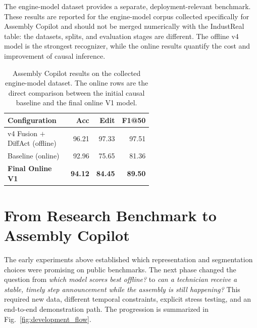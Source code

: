 \documentclass[11pt]{article}
\newcommand{\best}[1]{\textcolor{best}{\textbf{#1}}}
\begin{document}
The engine-model dataset provides a separate, deployment-relevant benchmark. These results are reported for the
engine-model corpus collected specifically for Assembly Copilot and should not be merged numerically with the
IndustReal table: the datasets, splits, and evaluation stages are different. The offline v4 model is the strongest
recognizer, while the online results quantify the cost and improvement of causal inference.

\begin{table}[H]
\centering
\caption{Assembly Copilot results on the collected engine-model dataset. The online rows are the direct comparison
between the initial causal baseline and the final online V1 model.}
\label{tab:engine_results}
\small
\begin{tabular}{@{}p{0.57\linewidth}rrr@{}}
\toprule
Configuration & Acc & Edit & F1@50 \\
\midrule
v4 Fusion $+$ DiffAct (offline) & 96.21 & 97.33 & 97.51 \\
Baseline (online) & 92.96 & 75.65 & 81.36 \\
\best{Final Online V1} & \best{94.12} & \best{84.45} & \best{89.50} \\
\bottomrule
\end{tabular}
\end{table}

\section{From Research Benchmark to Assembly Copilot}
\label{sec:copilot}

The early experiments above established which representation and segmentation choices were promising on public
benchmarks. The next phase changed the question from \emph{which model scores best offline?} to
\emph{can a technician receive a stable, timely step announcement while the assembly is still happening?}
This required new data, different temporal constraints, explicit stress testing, and an end-to-end demonstration
path. The progression is summarized in Fig.~\ref{fig:development_flow}.
\end{document}
